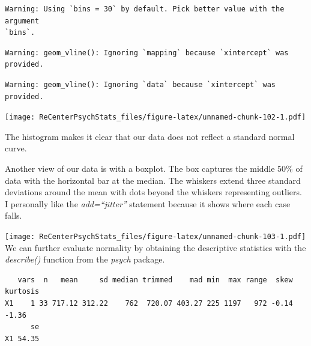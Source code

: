 \documentclass[
  11pt,
]{book}
\newenvironment{Shaded}{\begin{snugshade}}{\end{snugshade}}
\newcommand{\AttributeTok}[1]{\textcolor[rgb]{0.77,0.63,0.00}{#1}}
\newcommand{\ConstantTok}[1]{\textcolor[rgb]{0.00,0.00,0.00}{#1}}
\newcommand{\FunctionTok}[1]{\textcolor[rgb]{0.00,0.00,0.00}{#1}}
\newcommand{\NormalTok}[1]{#1}
\newcommand{\SpecialCharTok}[1]{\textcolor[rgb]{0.00,0.00,0.00}{#1}}
\newcommand{\StringTok}[1]{\textcolor[rgb]{0.31,0.60,0.02}{#1}}
\begin{document}
\begin{verbatim}
Warning: Using `bins = 30` by default. Pick better value with the argument
`bins`.
\end{verbatim}

\begin{verbatim}
Warning: geom_vline(): Ignoring `mapping` because `xintercept` was provided.
\end{verbatim}

\begin{verbatim}
Warning: geom_vline(): Ignoring `data` because `xintercept` was provided.
\end{verbatim}

\texttt{[image: ReCenterPsychStats\_files/figure-latex/unnamed-chunk-102-1.pdf]}

The histogram makes it clear that our data does not reflect a standard normal curve.

Another view of our data is with a boxplot. The box captures the middle 50\% of data with the horizontal bar at the median. The whiskers extend three standard deviations around the mean with dots beyond the whiskers representing outliers. I personally like the \emph{add=``jitter''} statement because it shows where each case falls.

\begin{Shaded}
\end{Shaded}

\texttt{[image: ReCenterPsychStats\_files/figure-latex/unnamed-chunk-103-1.pdf]}
We can further evaluate normality by obtaining the descriptive statistics with the \emph{describe()} function from the \emph{psych} package.

\begin{Shaded}
\end{Shaded}

\begin{verbatim}
   vars  n   mean     sd median trimmed    mad min  max range  skew kurtosis
X1    1 33 717.12 312.22    762  720.07 403.27 225 1197   972 -0.14    -1.36
      se
X1 54.35
\end{verbatim}
\end{document}
